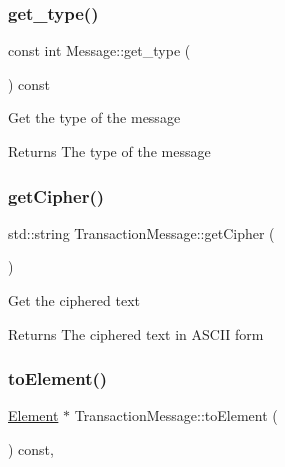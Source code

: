 \subsubsection{\texorpdfstring{get\+\_\+type()}{get\_type()}}
{\footnotesize\ttfamily const int Message\+::get\+\_\+type (\begin{DoxyParamCaption}{ }\end{DoxyParamCaption}) const\hspace{0.3cm}{\ttfamily [inherited]}}

Get the type of the message

\begin{DoxyReturn}{Returns}
The type of the message 
\end{DoxyReturn}
\mbox{\label{classTransactionMessage_abca09bbc62737a7d896f5478f3b3389a}} 
\subsubsection{\texorpdfstring{get\+Cipher()}{getCipher()}}
{\footnotesize\ttfamily std\+::string Transaction\+Message\+::get\+Cipher (\begin{DoxyParamCaption}{ }\end{DoxyParamCaption})}

Get the ciphered text

\begin{DoxyReturn}{Returns}
The ciphered text in A\+S\+C\+II form 
\end{DoxyReturn}
\mbox{\label{classTransactionMessage_ae20e7d6a7b5811bb56a32ec6af59b8e2}} 
\subsubsection{\texorpdfstring{to\+Element()}{toElement()}}
{\footnotesize\ttfamily \mbox{\hyperlink{classElement}{Element}} $\ast$ Transaction\+Message\+::to\+Element (\begin{DoxyParamCaption}{ }\end{DoxyParamCaption}) const\hspace{0.3cm}{\ttfamily [override]}, {\ttfamily [virtual]}}

